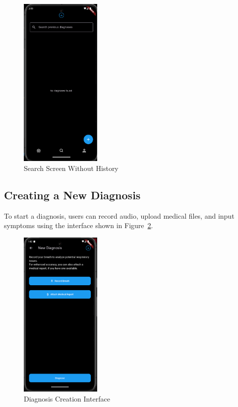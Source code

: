 \begin{figure}[H]
    \centering
    \includegraphics[width=0.35\textwidth]{images/UI_Screenshots/search_screen.png}
    \caption{Search Screen Without History}
    \label{fig:search_screen_empty}
\end{figure}

\subsection{Creating a New Diagnosis}

To start a diagnosis, users can record audio, upload medical files, and input symptoms using the interface shown in Figure~\ref{fig:create_diagnosis}.

\begin{figure}[H]
    \centering
    \includegraphics[width=0.35\textwidth]{images/UI_Screenshots/create_diagnosis_screen.png}
    \caption{Diagnosis Creation Interface}
    \label{fig:create_diagnosis}
\end{figure}

